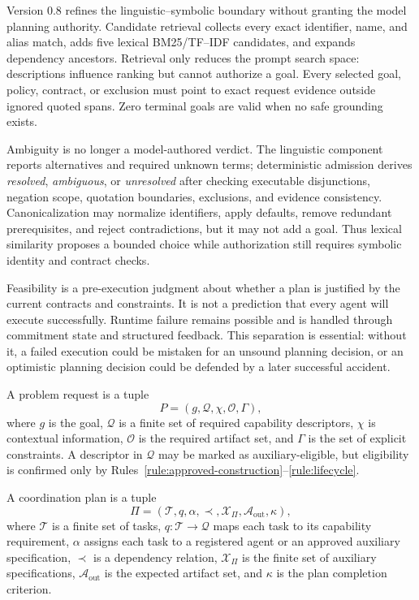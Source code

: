 Version 0.8 refines the linguistic--symbolic boundary without granting the model planning authority. Candidate retrieval collects every exact identifier, name, and alias match, adds five lexical BM25/TF--IDF candidates, and expands dependency ancestors. Retrieval only reduces the prompt search space: descriptions influence ranking but cannot authorize a goal. Every selected goal, policy, contract, or exclusion must point to exact request evidence outside ignored quoted spans. Zero terminal goals are valid when no safe grounding exists.

Ambiguity is no longer a model-authored verdict. The linguistic component reports alternatives and required unknown terms; deterministic admission derives \emph{resolved}, \emph{ambiguous}, or \emph{unresolved} after checking executable disjunctions, negation scope, quotation boundaries, exclusions, and evidence consistency. Canonicalization may normalize identifiers, apply defaults, remove redundant prerequisites, and reject contradictions, but it may not add a goal. Thus lexical similarity proposes a bounded choice while authorization still requires symbolic identity and contract checks.

Feasibility is a pre-execution judgment about whether a plan is justified by the current contracts and constraints. It is not a prediction that every agent will execute successfully. Runtime failure remains possible and is handled through commitment state and structured feedback. This separation is essential: without it, a failed execution could be mistaken for an unsound planning decision, or an optimistic planning decision could be defended by a later successful accident.

\begin{definition}
\label{def:problem-request}
A problem request is a tuple
\[
P = (g, \mathcal{Q}, \chi, \mathcal{O}, \Gamma),
\]
where $g$ is the goal, $\mathcal{Q}$ is a finite set of required capability descriptors, $\chi$ is contextual information, $\mathcal{O}$ is the required artifact set, and $\Gamma$ is the set of explicit constraints. A descriptor in $\mathcal{Q}$ may be marked as auxiliary-eligible, but eligibility is confirmed only by Rules~\ref{rule:approved-construction}--\ref{rule:lifecycle}.
\end{definition}

\begin{definition}
\label{def:coordination-plan}
A coordination plan is a tuple
\[
\Pi = (\mathcal{T}, q, \alpha, \prec, \mathcal{X}_{\Pi}, \mathcal{A}_{\mathrm{out}}, \kappa),
\]
where $\mathcal{T}$ is a finite set of tasks, $q:\mathcal{T}\rightarrow\mathcal{Q}$ maps each task to its capability requirement, $\alpha$ assigns each task to a registered agent or an approved auxiliary specification, $\prec$ is a dependency relation, $\mathcal{X}_{\Pi}$ is the finite set of auxiliary specifications, $\mathcal{A}_{\mathrm{out}}$ is the expected artifact set, and $\kappa$ is the plan completion criterion.
\end{definition}

